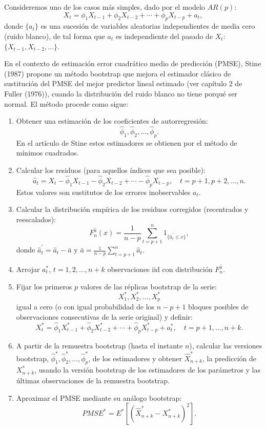 \documentclass[
]{book}
\theoremstyle{definition}
\theoremstyle{definition}
\theoremstyle{definition}
\theoremstyle{remark}
\begin{document}
Consideremos uno de los casos más simples, dado por el modelo \(AR(p)\):
\[X_{t}=\phi _1X_{t-1}+\phi _2X_{t-2}+\cdots +\phi _{p}X_{t-p}+a_{t},\]donde
\(\{a_{t}\}\) es una sucesión de variables aleatorias independientes de
media cero (ruido blanco), de tal forma que \(a_{t}\) es independiente del
pasado de \(X_{t}\): \(\{X_{t-1},X_{t-2},\ldots \}\).

En el contexto de estimación error cuadrático medio de predicción
(PMSE), Stine (1987) propone un método bootstrap que mejora el estimador
clásico de sustitución del PMSE del mejor predictor lineal estimado (ver
capítulo 2 de Fuller (1976)), cuando la distribución del ruido blanco no
tiene porqué ser normal. El método procede como sigue:

\begin{enumerate}
\def\labelenumi{\arabic{enumi}.}
\item
  Obtener una estimación de los coeficientes de autorregresión:
  \[\widehat{\phi}_1,\widehat{\phi}_2,\ldots ,\widehat{\phi}_{p}.\]En
  el artículo de Stine estos estimadores se obtienen por el método de
  mínimos cuadrados.
\item
  Calcular los residuos (para aquellos índices que sea posible):
  \[\widehat{a}_{t}=X_{t}-\widehat{\phi}_1X_{t-1}-\widehat{\phi}
  _2X_{t-2}+\cdots -\widehat{\phi}_{p}X_{t-p},\quad t=p+1,p+2,\ldots ,n.\]
  Estos valores son sustitutos de los errores inobservables \(a_{t}\).
\item
  Calcular la distribución empírica de los residuos corregidos
  (recentrados y reescalados):
  \[F_n^{\widehat{a}}(x)=\frac{1}{n-p}\sum_{t=p+1}^{n}1_{\{\widehat{a}_{t}^{\prime}\leq x\}},\]
  donde \(\widehat{a}_{t}^{\prime}=\widehat{a}_{t}-\bar{a}\) y
  \(\bar{a}=\frac{1}{n-p}\sum_{t=p+1}^{n}\widehat{a}_{t}\).
\item
  Arrojar \(a_{t}^{\ast}\), \(t=1,2,\ldots ,n+k\) observaciones iid con
  distribución \(F_n^{\widehat{a}}\).
\item
  Fijar los primeros \(p\) valores de las réplicas bootstrap de la serie:
  \[X_1^{\ast},X_2^{\ast},\ldots ,X_{p}^{\ast}\]
  igual a cero (o con igual probabilidad de los \(n-p+1\) bloques posibles
  de observaciones consecutivas de la serie original) y definir:
  \[X_{t}^{\ast}=\widehat{\phi}_1X_{t-1}^{\ast}+\widehat{\phi}_2
  X_{t-2}^{\ast}+\cdots +\widehat{\phi}_{p}X_{t-p}^{\ast}+a_{t}^{\ast},
  \quad t=p+1,\ldots ,n+k.\]
\item
  A partir de la remuestra bootstrap (hasta el instante \(n\)), calcular
  las versiones bootstrap,
  \(\widehat{\phi}_1^{\ast},\widehat{\phi} _2^{\ast},\ldots ,\widehat{\phi}_{p}^{\ast}\), de los
  estimadores y obtener \(\widehat{X}_{n+k}^{\ast}\), la predicción de
  \(X_{n+k}^{\ast}\), usando la versión bootstrap de los estimadores de
  los parámetros y las últimas observaciones de la remuestra
  bootstrap.
\item
  Aproximar el PMSE mediante su análogo bootstrap:
  \[PMSE^{\ast}=E^{\ast}\left[ \left( \widehat{X}_{n+k}^{\ast}-X_{n+k}^{\ast
  } \right)^2\right] .\]
\end{enumerate}
\end{document}
